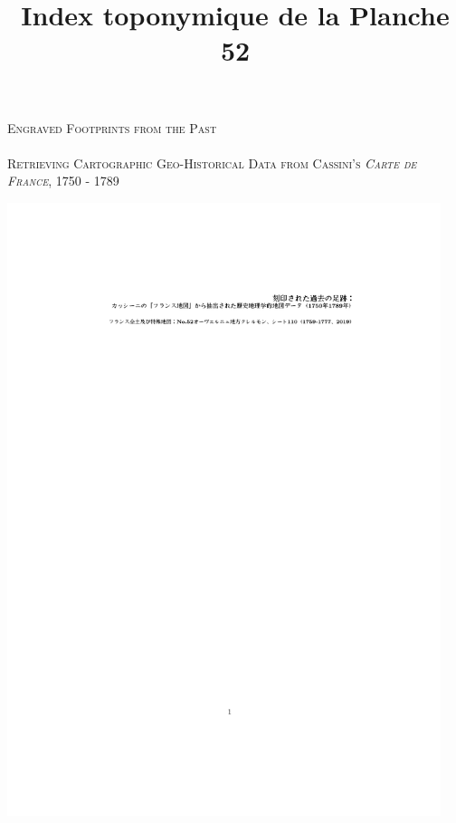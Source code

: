 \documentclass[portrait,a0]{sciposter}
\title{Index toponymique de la Planche 52}
\institute{EHESS}
\begin{document}
{}
\bgroup
\setlength{\parindent}{-0.1em} 
\begin{minipage}[t]{0.55\textwidth}
  \Huge
  \textsc{Engraved Footprints from the Past}\\~\\
  \Large \textsc{Retrieving Cartographic Geo-Historical Data from Cassini’s \emph{Carte de France}, 1750 - 1789}
\end{minipage}
\begin{minipage}[t]{0.44\textwidth}
  \vspace*{-3.2cm}
  \hfill
  \includegraphics[width=0.95\textwidth, trim= 5cm 26cm 4cm 22cm, clip]{gfx/jap.pdf}
\end{minipage}
\egroup

\vspace{1cm}
\end{document}
